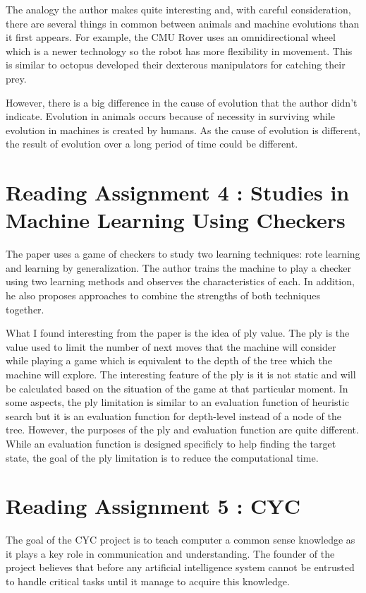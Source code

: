 \documentclass{article}
\begin{document}
The analogy the author makes quite interesting and, with careful consideration, there are several things in common between animals and machine evolutions than it first appears. For example, the CMU Rover uses an omnidirectional wheel which is a newer technology so the robot has more flexibility in movement. This is similar to octopus developed their dexterous manipulators for catching their prey.

However, there is a big difference in the cause of evolution that the author didn’t indicate. Evolution in animals occurs because of necessity in surviving while evolution in machines is created by humans. As the cause of evolution is different, the result of evolution over a long period of time could be different.

\section*{Reading Assignment 4 : Studies in Machine Learning Using Checkers}
The paper uses a game of checkers to study two learning techniques: rote
learning and learning by generalization. The author trains the machine to play a checker using two learning methods and observes the characteristics of each. In addition, he also proposes approaches to combine the strengths of both techniques together.

What I found interesting from the paper is the idea of ply value. The ply
is the value used to limit the number of next moves that the machine will
consider while playing a game which is equivalent to the depth of the tree which the machine will explore. The interesting feature of the ply is it is not static and will be calculated based on the situation of the game at that particular moment. In some aspects, the ply limitation is similar to an evaluation function of heuristic search but it is an evaluation function for depth-level instead of a node of the tree. However, the purposes of the ply and evaluation function are quite different. While an evaluation function is designed specificly to help finding the target state, the goal of the ply limitation is to reduce the computational time.
\clearpage

\section*{Reading Assignment 5 : CYC}

The goal of the CYC project is to teach computer a common sense knowledge as it plays a key role in communication and understanding. The founder of the project believes that before any artificial intelligence system cannot be entrusted to handle critical tasks until it manage to acquire this knowledge. 
\end{document}
